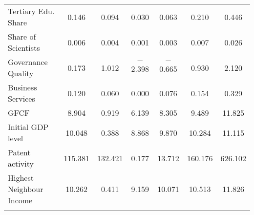 \documentclass[11pt]{article}
\begin{document}
\begin{table}[!htbp]
\begin{tabular}{@{\extracolsep{5pt}}lcccccc}
Tertiary Edu. Share & 0.146 & 0.094 & 0.030 & 0.063 & 0.210 & 0.446 \\ 
Share of Scientists & 0.006 & 0.004 & 0.001 & 0.003 & 0.007 & 0.026 \\ 
Governance Quality & 0.173 & 1.012 & $-$2.398 & $-$0.665 & 0.930 & 2.120 \\  
Business Services & 0.120 & 0.060 & 0.000 & 0.076 & 0.154 & 0.329 \\ 
GFCF & 8.904 & 0.919 & 6.139 & 8.305 & 9.489 & 11.825 \\  
Initial GDP level & 10.048 & 0.388 & 8.868 & 9.870 & 10.284 & 11.115 \\ 
Patent activity  & 115.381 & 132.421 & 0.177 & 13.712 & 160.176 & 626.102 \\ 
Highest Neighbour Income & 10.262 & 0.411 & 9.159 & 10.071 & 10.513 & 11.826 \\ 
\hline \\[-1.8ex] 
\end{tabular} 
\end{table} 
\end{document}
